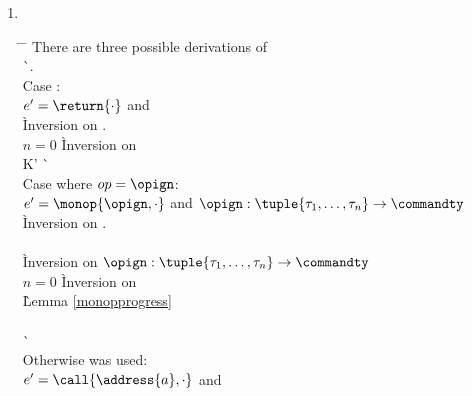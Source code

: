 \begin{enumerate}
\begin{enumerate}
\begin{enumerate}
\begin{enumerate}
      \item {} \ \\
        \begin{tabbing}
        \hspace{3em} \= \hspace{3em} \= \kill
        There are three possible derivations of \\
          \` . \\
        Case : \+ \\
          $e' = \return{\cdot}$ and  \\
            \` Inversion on . \\
          $n = 0$
            \` Inversion on  \\
                   {\mu}{K'}{\lhd}{\tupleexp{}}
            \`  \- \\
        Case  where $op = \opign$: \+ \\
          $e' = \monop{\opign, \cdot}$ and $\opign : \tuple{\tau_1,\ldots,\tau_n} \rightarrow \commandty$ \\
            \` Inversion on . \\
           \\
            \` Inversion on $\opign : \tuple{\tau_1,\ldots,\tau_n} \rightarrow \commandty$ \\
          $n = 0$
            \` Inversion on  \\
            \` Lemma \ref{monopprogress} \\
           \\
            \`  \- \\
        Otherwise  was used: \+ \\
          $e' = \call{\address{a}, \cdot{}}$ and

\end{tabbing}
\end{enumerate}
\end{enumerate}
\end{enumerate}
\end{enumerate}
